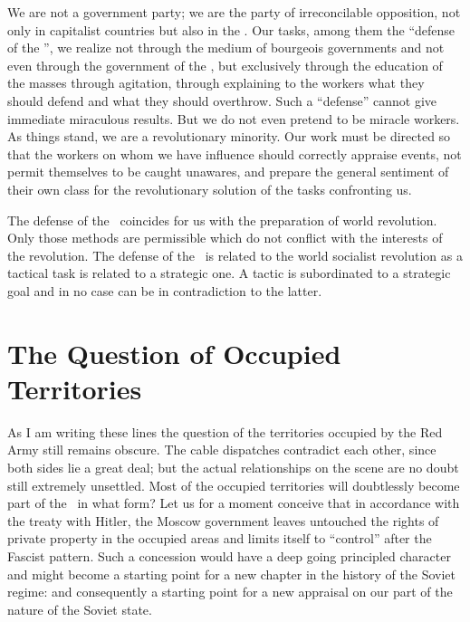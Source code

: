 We are not a government party; we are the party of irreconcilable opposition, not only in capitalist countries but also in the \USSR. Our tasks, among them the “defense of the \USSR”, we realize not through the medium of bourgeois governments and not even through the government of the \USSR, but exclusively through the education of the masses through agitation, through explaining to the workers what they should defend and what they should overthrow. Such a “defense” cannot give immediate miraculous results. But we do not even pretend to be miracle workers. As things stand, we are a revolutionary minority. Our work must be directed so that the workers on whom we have influence should correctly appraise events, not permit themselves to be caught unawares, and prepare the general sentiment of their own class for the revolutionary solution of the tasks confronting us.

The defense of the \USSR\ coincides for us with the preparation of world revolution. Only those methods are permissible which do not conflict with the interests of the revolution. The defense of the \USSR\ is related to the world socialist revolution as a tactical task is related to a strategic one. A tactic is subordinated to a strategic goal and in no case can be in contradiction to the latter.
\nowidow

\section*{The Question of Occupied Territories}

As I am writing these lines the question of the territories occupied by the Red Army still remains obscure. The cable dispatches contradict each other, since both sides lie a great deal; but the actual relationships on the scene are no doubt still extremely unsettled. Most of the occupied territories will doubtlessly become part of the \USSR\ in what form? Let us for a moment conceive that in accordance with the treaty with Hitler, the Moscow government leaves untouched the rights of private property in the occupied areas and limits itself to “control” after the Fascist pattern. Such a concession would have a deep going principled character and might become a starting point for a new chapter in the history of the Soviet regime: and consequently a starting point for a new appraisal on our part of the nature of the Soviet state.

